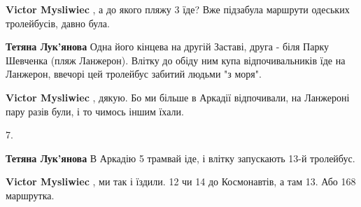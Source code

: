 \begin{itemize}
\begin{itemize}
\textbf{Victor Mysliwiec} , а до якого пляжу 3 їде? Вже підзабула маршрути одеських тролейбусів, давно була.

 
\textbf{Тетяна Лук'янова} Одна його кінцева на другій Заставі, друга - біля Парку Шевченка (пляж Ланжерон). Влітку до обіду ним купа відпочивальників їде на Ланжерон, ввечорі цей тролейбус забитий людьми "з моря".

 
\textbf{Victor Mysliwiec} , дякую. Бо ми більше в Аркадії відпочивали, на Ланжероні пару разів були, і то чимось іншим їхали.

 
7.

 
\textbf{Тетяна Лук'янова} В Аркадію 5 трамвай іде, і влітку запускають 13-й тролейбус.

 
\textbf{Victor Mysliwiec} , ми так і їздили. 12 чи 14 до Космонавтів, а там 13. Або 168 маршрутка.
\end{itemize}

 


\end{itemize}
